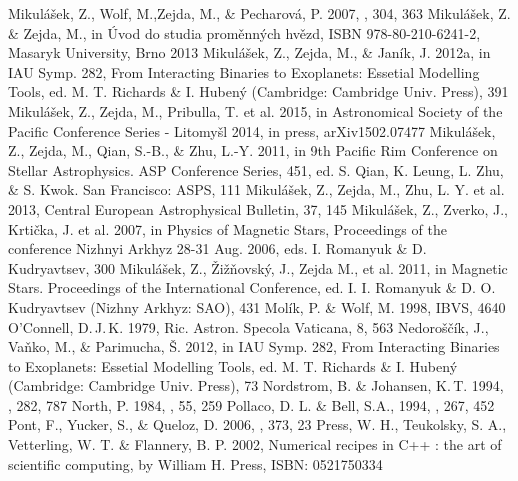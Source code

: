 \documentclass{aa}
\begin{document}
\begin{thebibliography}{}
 Mikul\'a\v{s}ek, Z., Wolf, M.,Zejda, M., \& Pecharov\'a, P. 2007, \apss, 304, 363
 Mikul\'a\v{s}ek, Z. \& Zejda, M., in \'Uvod do studia prom\v{e}nn\'{y}ch hv\v{e}zd, ISBN 978-80-210-6241-2,  Masaryk University, Brno 2013
 Mikul\'a\v{s}ek, Z., Zejda, M., \& Jan\'{i}k, J. 2012a, in IAU Symp. 282, From Interacting Binaries to Exoplanets: Essetial Modelling Tools, ed. M. T. Richards \& I. Huben\'y (Cambridge: Cambridge Univ. Press), 391
 Mikul\'a\v{s}ek, Z., Zejda, M., Pribulla, T. et al. 2015, in Astronomical Society of the Pacific Conference Series - Litomy\v{s}l 2014, in press, arXiv1502.07477
 Mikul\'a\v{s}ek, Z., Zejda, M., Qian, S.-B., \& Zhu, L.-Y. 2011, in 9th Pacific Rim Conference on Stellar Astrophysics. ASP Conference Series, 451, ed. S. Qian, K. Leung, L. Zhu, \& S. Kwok. San Francisco: ASPS, 111
 Mikul\'a\v{s}ek, Z., Zejda, M., Zhu, L. Y. et al. 2013, Central European Astrophysical Bulletin, 37, 145
 Mikul\'a\v{s}ek, Z., Zverko, J., Krti\v{c}ka, J. et al. 2007, in Physics of Magnetic Stars, Proceedings of the conference Nizhnyi Arkhyz 28-31 Aug. 2006,  eds. I. Romanyuk \& D. Kudryavtsev, 300
 Mikul\'a\v{s}ek, Z., \v{Z}i\v{z}\v{n}ovsk\'y, J., Zejda M., et al. 2011, in Magnetic Stars. Proceedings of the International Conference, ed. I. I. Romanyuk \& D. O. Kudryavtsev (Nizhny Arkhyz: SAO), 431
 Mol\'{i}k, P. \& Wolf, M. 1998, IBVS, 4640
 O'Connell, D.\,J.\,K. 1979, Ric. Astron. Specola Vaticana, 8, 563
 Nedoro\v{s}\v{c}\'ik, J., Va\v{n}ko, M., \& Parimucha, \v{S}. 2012, in IAU Symp. 282, From Interacting Binaries to Exoplanets: Essetial Modelling Tools, ed. M. T. Richards \& I. Huben\'y (Cambridge: Cambridge Univ. Press), 73
 Nordstrom, B. \& Johansen, K.\,T. 1994, \aap, 282, 787
 North, P. 1984, \aaps, 55, 259
 Pollaco, D. L. \& Bell, S.A., 1994, \mnras, 267, 452
 Pont, F., Yucker, S., \& Queloz, D. 2006, \mnras, 373, 23
 Press, W. H., Teukolsky, S. A., Vetterling, W. T. \& Flannery, B. P. 2002,  Numerical recipes in C++ : the art of scientific computing, by William H. Press, ISBN: 0521750334

\end{thebibliography}
\end{document}
